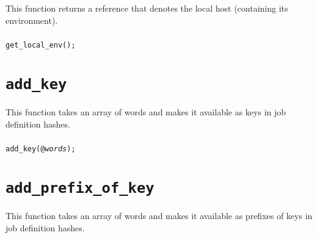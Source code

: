 \documentclass[a4paper,10pt]{report}
\begin{document}
This function returns a reference that denotes the local host
(containing its environment).

\subsubsection{\format}

\begin{boxnote}
\begin{alltt}
get_local_env();
\end{alltt}
\end{boxnote}

\subsubsection{\example}



\section{\texttt{add\_key}}

This function takes an array of words and makes it available as keys in job
definition hashes.

\subsubsection{\format}

\begin{boxnote}
\begin{alltt}
add_key(@\textit{words});
\end{alltt}
\end{boxnote}
\vspace{\baselineskip}

\section{\texttt{add\_prefix\_of\_key}}

This function takes an array of words and makes it available as
prefixes of keys in job definition hashes.

\subsubsection{\format}
\end{document}
